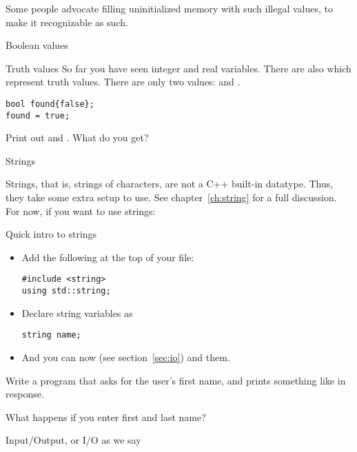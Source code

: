 Some people advocate filling uninitialized memory with such illegal
values, to make it recognizable as such.

 {Boolean values}

\begin{block}{Truth values}
  \label{sl:bool-var}
  So far you have seen integer and real variables. There are also
   which represent truth values. There are
  only two values:  and .
\begin{verbatim}
bool found{false};
found = true;
\end{verbatim}
\end{block}

\begin{exercise}
  \label{ex:print-truefalse}
  Print out  and . What do you get?
\end{exercise}

 {Strings}

Strings, that is, strings of characters, are not a C++ built-in
datatype. Thus, they take some extra setup to use.
See chapter~\ref{ch:string} for a full discussion.
For now, if you
want to use strings:

\begin{block}{Quick intro to strings}
  \label{sl:quick-string}
  \begin{itemize}
  \item Add the following at the top of your file:
\begin{verbatim}
#include <string>
using std::string;
\end{verbatim}
\item Declare string variables as
\begin{verbatim}
string name;
\end{verbatim}
\item And you can now  (see section~\ref{sec:io}) and  them.
  \end{itemize}
\end{block}

\begin{exercise}
  \label{ex:ask-for-name}
  Write a program that asks for the user's first name, and prints
  something like  in response.

  What happens if you enter first and last name?
\end{exercise}

 {Input/Output, or I/O as we say}
\label{sec:io}

